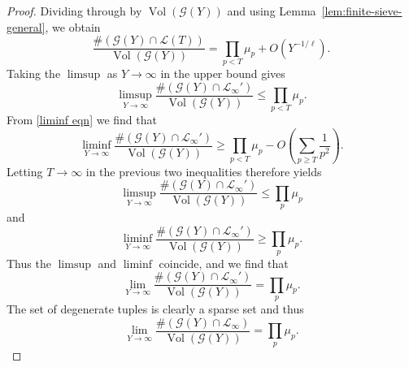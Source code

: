 \documentclass[10pt,a4paper]{amsart}
\newcommand{\op}[1]{\operatorname{#1}}
\begin{document}
\begin{proof}
Dividing through by $\op{Vol}(\mathcal G(Y))$ and using
Lemma~\ref{lem:finite-sieve-general}, we obtain
\[
\frac{\#(\mathcal G(Y)\cap\mathcal L(T))}
{\op{Vol}(\mathcal G(Y))}
=
\prod_{p<T}\mu_p
+
O\!\left(Y^{-1/\ell}\right).
\]
Taking the $\limsup$ as $Y\to\infty$ in the upper bound gives
\[
\limsup_{Y\to\infty}
\frac{\#(\mathcal G(Y)\cap\mathcal L_\infty')}
{\op{Vol}(\mathcal G(Y))}
\le
\prod_{p<T}\mu_p .
\]
From \eqref{liminf eqn} we find that
\[
\liminf_{Y\to\infty}
\frac{\#(\mathcal G(Y)\cap\mathcal L_\infty')}
{\op{Vol}(\mathcal G(Y))}
\ge
\prod_{p<T}\mu_p
-
O\!\left(\sum_{p\geq T} \frac{1}{p^2}\right).
\]
Letting $T\to\infty$ in the previous two inequalities therefore yields
\[
\limsup_{Y\to\infty}
\frac{\#(\mathcal G(Y)\cap\mathcal L_\infty')}
{\op{Vol}(\mathcal G(Y))}
\le
\prod_p\mu_p
\]
and
\[
\liminf_{Y\to\infty}
\frac{\#(\mathcal G(Y)\cap\mathcal L_\infty')}
{\op{Vol}(\mathcal G(Y))}
\ge
\prod_p\mu_p .
\]
\noindent Thus the $\limsup$ and $\liminf$ coincide, and we find that
\[
\lim_{Y\to\infty}
\frac{\#(\mathcal G(Y)\cap\mathcal L_\infty')}
{\op{Vol}(\mathcal G(Y))}
=
\prod_p\mu_p.
\]
The set of degenerate tuples is clearly a sparse set and thus 
\[
\lim_{Y\to\infty}
\frac{\#(\mathcal G(Y)\cap\mathcal L_\infty)}
{\op{Vol}(\mathcal G(Y))}
=
\prod_p\mu_p.
\]
\end{proof}
\end{document}
